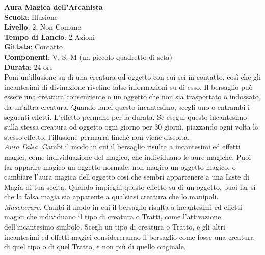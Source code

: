 \begin{multicols}{2}
\medskip\textbf{Aura Magica dell'Arcanista}\\
\textbf{Scuola}: Illusione\\
\textbf{Livello}: 2, Non Comune\\
\textbf{Tempo di Lancio}: 2 Azioni\\
\textbf{Gittata}: Contatto\\
\textbf{Componenti}: V, S, M (un piccolo quadretto di seta)\\
\textbf{Durata}: 24 ore\\
Poni un'illusione su di una creatura od oggetto con cui sei in contatto, così che gli incantesimi di divinazione rivelino false informazioni su di esso. Il bersaglio può essere una creatura consenziente o un oggetto che non sia trasportato o indossato da un'altra creatura. Quando lanci questo incantesimo, scegli uno o entrambi i seguenti effetti. L'effetto permane per la durata. Se esegui questo incantesimo sulla stessa creatura od oggetto ogni giorno per 30 giorni, piazzando ogni volta lo stesso effetto, l'illusione permarrà finché non viene dissolta.\\
\textit{Aura Falsa}. Cambi il modo in cui il bersaglio risulta a incantesimi ed effetti magici, come individuazione del magico, che individuano le aure magiche. Puoi far apparire magico un oggetto normale, non magico un oggetto magico, o cambiare l'aura magica dell'oggetto così che sembri appartenere a una Liste di Magia di tua scelta. Quando impieghi questo effetto su di un oggetto, puoi far sì che la falsa magia sia apparente a qualsiasi creatura che lo manipoli.\\
\textit{Mascherare}. Cambi il modo in cui il bersaglio risulta a incantesimi ed effetti magici che individuano il tipo di creatura o Tratti, come l'attivazione dell'incantesimo simbolo. Scegli un tipo di creatura o Tratto, e gli altri incantesimi ed effetti magici considereranno il bersaglio come fosse una creatura di quel tipo o di quel Tratto, e non più di quello originale.


\end{multicols}
